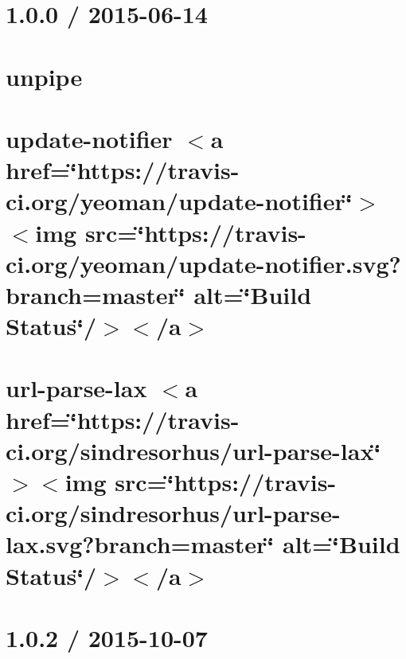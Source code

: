 \let\mypdfximage\pdfximage\def\pdfximage{\immediate\mypdfximage}\documentclass[twoside]{book}
\newcommand{\+}{\discretionary{\mbox{\scriptsize$\hookleftarrow$}}{}{}}
\begin{document}
\chapter{1.0.0 / 2015-\/06-\/14}
\label{md__c_1__git_hub__p_r_o_y_e_c_t_o-_i_i_i-_g_o_t_rest-api-node-mysql_node_modules_unpipe__h_i_s_t_o_r_y}

\chapter{unpipe}
\label{md__c_1__git_hub__p_r_o_y_e_c_t_o-_i_i_i-_g_o_t_rest-api-node-mysql_node_modules_unpipe__r_e_a_d_m_e}

\chapter{update-\/notifier $<$a href=\char`\"{}https\+://travis-\/ci.\+org/yeoman/update-\/notifier\char`\"{}$>$$<$img src=\char`\"{}https\+://travis-\/ci.\+org/yeoman/update-\/notifier.\+svg?branch=master\char`\"{} alt=\char`\"{}\+Build Status\char`\"{}/$>$$<$/a$>$}
\label{md__c_1__git_hub__p_r_o_y_e_c_t_o-_i_i_i-_g_o_t_rest-api-node-mysql_node_modules_update-notifier_readme}

\chapter{url-\/parse-\/lax $<$a href=\char`\"{}https\+://travis-\/ci.\+org/sindresorhus/url-\/parse-\/lax\char`\"{}$>$$<$img src=\char`\"{}https\+://travis-\/ci.\+org/sindresorhus/url-\/parse-\/lax.\+svg?branch=master\char`\"{} alt=\char`\"{}\+Build Status\char`\"{}/$>$$<$/a$>$}
\label{md__c_1__git_hub__p_r_o_y_e_c_t_o-_i_i_i-_g_o_t_rest-api-node-mysql_node_modules_url-parse-lax_readme}

\chapter{1.0.2 / 2015-\/10-\/07}
\label{md__c_1__git_hub__p_r_o_y_e_c_t_o-_i_i_i-_g_o_t_rest-api-node-mysql_node_modules_util-deprecate__history}

\end{document}
